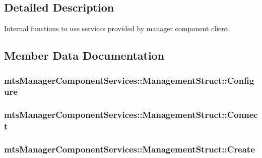 \subsection{Detailed Description}
Internal functions to use services provided by manager component client 

\subsection{Member Data Documentation}
\hypertarget{structmts_manager_component_services_1_1_management_struct_aa68ade6cba2367681d59fb29073bdf46}{
\subsubsection[{Configure}]{ mts\-Manager\-Component\-Services\-::\-Management\-Struct\-::\-Configure}}\label{structmts_manager_component_services_1_1_management_struct_aa68ade6cba2367681d59fb29073bdf46}
\hypertarget{structmts_manager_component_services_1_1_management_struct_a9050a3d86db6adcc5dfbb424812b9516}{
\subsubsection[{Connect}]{ mts\-Manager\-Component\-Services\-::\-Management\-Struct\-::\-Connect}}\label{structmts_manager_component_services_1_1_management_struct_a9050a3d86db6adcc5dfbb424812b9516}
\hypertarget{structmts_manager_component_services_1_1_management_struct_ade9314ac542774096dc400785a895a9f}{
\subsubsection[{Create}]{ mts\-Manager\-Component\-Services\-::\-Management\-Struct\-::\-Create}}\label{structmts_manager_component_services_1_1_management_struct_ade9314ac542774096dc400785a895a9f}
